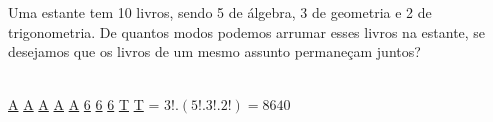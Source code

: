 \begin{ex}
 Uma estante tem 10 livros, sendo 5 de álgebra, 3 de geometria e 2 de trigonometria. De quantos modos podemos arrumar esses livros na estante, se desejamos que os livros de um mesmo assunto permaneçam juntos?
 
 \begin{sol}
     \phantom{A} \\
 
    \underline{A} \underline{A} \underline{A} \underline{A} \underline{A} \underline{6} \underline{6} \underline{6} \underline{T} \underline{T} = $3!.(5!.3!.2!) = 8640$
 \end{sol}
\end{ex}